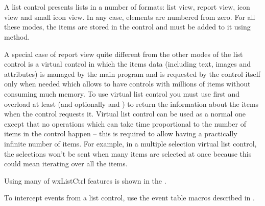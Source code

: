 
\section{}\label{wxlistctrl}

A list control presents lists in a number of formats: list view, report view,
icon view and small icon view. In any case, elements are numbered from zero.
For all these modes, the items are stored in the control and must be added to
it using  method.

A special case of report view quite different from the other modes of the list
control is a virtual control in which the items data (including text, images
and attributes) is managed by the main program and is requested by the control
itself only when needed which allows to have controls with millions of items
without consuming much memory. To use virtual list control you must use
 first and overload at least
 (and optionally
 and
) to return the information
about the items when the control requests it. Virtual list control can be used
as a normal one except that no operations which can take time proportional to
the number of items in the control happen -- this is required to allow having a
practically infinite number of items. For example, in a multiple selection
virtual list control, the selections won't be sent when many items are selected
at once because this could mean iterating over all the items.

Using many of wxListCtrl features is shown in the
.

To intercept events from a list control, use the event table macros described
in .


\\
\\
\\

